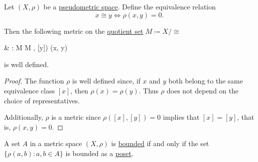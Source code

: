 \begin{proposition}\label{thm:pseudometric_to_metric}
  Let \( (X, \rho) \) be a \hyperref[def:metric_space]{pseudometric space}. Define the equivalence relation
  \begin{equation*}
    x \cong y \iff \rho(x, y) = 0.
  \end{equation*}

  Then the following metric on the \hyperref[thm:equivalence_partition]{quotient set} \( M \coloneqq X / \cong \)
  \begin{BreakableAlign*}
     & \rho: M \times M \to [0, \infty)    \\
     & \rho([x], [y]) \coloneqq \rho(x, y)
  \end{BreakableAlign*}
  is well defined.
\end{proposition}
\begin{proof}
  The function \( \rho \) is well defined since, if \( x \) and \( y \) both belong to the same equivalence class \( [x] \), then \( \rho(x) = \rho(y) \). Thus \( \rho \) does not depend on the choice of representatives.

  Additionally, \( \rho \) is a metric since \( \rho([x], [y]) = 0 \) implies that \( [x] = [y] \), that is, \( \rho(x, y) = 0 \).
\end{proof}

\begin{proposition}\label{rem:bounded_set_metric_order_equivalence}
  A set \( A \) in a metric space \( (X, \rho) \) is \hyperref[def:metric_space/bounded_set]{bounded} if and only if the set \( \{ \rho(a, b) \colon a, b \in A \} \) is bounded as a \hyperref[def:preordered_set/bounded_set]{poset}.
\end{proposition}

